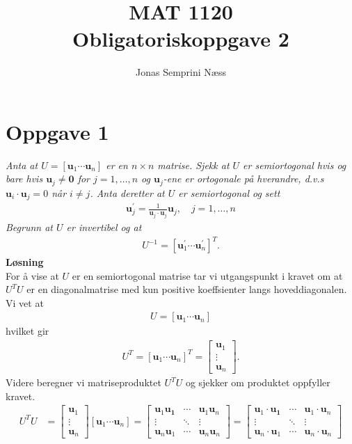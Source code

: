 \documentclass[12pt,
               a4paper,
               article,
               oneside,
               oldfontcommands,
               norsk]{memoir}
\title{ MAT 1120\\
[0.25in]
\normalsize Obligatoriskoppgave 2}
\author{Jonas Semprini Næss}
\begin{document}
\maketitle
\section*{Oppgave 1}
\emph{Anta at $U = \left[ \boldsymbol{u}_1 \cdots \boldsymbol{u}_n \right]$ er en $n \times n$ matrise. Sjekk at $U$ er semiortogonal hvis og bare hvis $\boldsymbol{u}_j \neq \boldsymbol{0}$ for $j = 1, \hdots , n$ og $\boldsymbol{u}_j$-ene er ortogonale på hverandre, d.v.s $\boldsymbol{u}_i  \cdot \boldsymbol{u}_j= 0$ når $i \neq j$. Anta deretter at $U$ er semiortogonal og sett}
\begin{align*}
\boldsymbol{u}_{j}^{'} = \frac{1}{\boldsymbol{u}_j \cdot \boldsymbol{u}_j} \boldsymbol{u}_j,  \quad j = 1, \hdots, n
\end{align*}
\emph{Begrunn at $U$ er invertibel og at}
\begin{align*}
U^{-1} = \left[\boldsymbol{u}_{1}^{'} \cdots \boldsymbol{u}_{n}^{'}\right]^{T}.
\end{align*}
\textbf{Løsning}\vspace{3mm}\\
For å vise at $U$ er en semiortogonal matrise tar vi utgangspunkt i kravet om at $U^{T}U$ er en diagonalmatrise med kun positive koeffsienter langs hoveddiagonalen. Vi vet at 
\begin{align*}
U = \left[ \boldsymbol{u}_1 \cdots \boldsymbol{u}_n \right]
\end{align*}
hvilket gir
\begin{align*}
U^{T} = \left[ \boldsymbol{u}_1 \cdots \boldsymbol{u}_n \right]^{T} = \begin{bmatrix}
\boldsymbol{u}_1 \\
\vdots \\
\boldsymbol{u}_n
\end{bmatrix}.
\end{align*}
Videre beregner vi matriseproduktet $U^{T}U$ og sjekker om produktet oppfyller kravet.
\begin{align*}
U^{T}U &= 
\begin{bmatrix}
	\boldsymbol{u}_1 \\
	\vdots \\
	\boldsymbol{u}_n
\end{bmatrix} \left[ \boldsymbol{u}_1 \cdots \boldsymbol{u}_n \right] =
\begin{bmatrix}
	\boldsymbol{u}_1 \boldsymbol{u_1} &\cdots & \boldsymbol{u}_1 					\boldsymbol{u}_n\\
	\vdots &\ddots & \vdots \\	
	\boldsymbol{u}_n\boldsymbol{u}_1 &\cdots &\boldsymbol{u}_n\boldsymbol{u}_n
\end{bmatrix}
= \begin{bmatrix}
	\boldsymbol{u}_1 \cdot \boldsymbol{u_1} &\cdots & \boldsymbol{u}_1 	\cdot \boldsymbol{u}_n\\
	\vdots &\ddots & \vdots \\	
	\boldsymbol{u}_n \cdot \boldsymbol{u}_1 &\cdots &\boldsymbol{u}_n\cdot \boldsymbol{u}_n
\end{bmatrix}
\end{align*}
\end{document}
